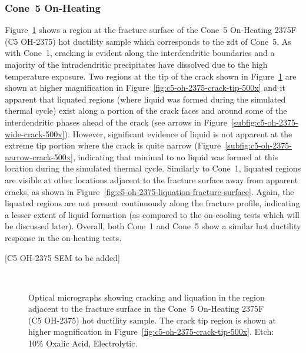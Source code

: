 \subsubsection{Cone~5 On-Heating}
Figure~\ref{fig:c5-oh-2375-olm-fracture} shows a region at the fracture surface of the Cone~5 On-Heating 2375\textdegree{}F (C5 OH-2375) hot ductility sample which corresponds to the \gls{zdt} of Cone~5. As with Cone~1, cracking is evident along the interdendritic boundaries and a majority of the intradendritic precipitates have dissolved due to the high temperature exposure. Two regions at the tip of the crack shown in Figure~\ref{fig:c5-oh-2375-olm-fracture} are shown at higher magnification in Figure~\ref{fig:c5-oh-2375-crack-tip-500x} and it apparent that liquated regions (where liquid was formed during the simulated thermal cycle) exist along a portion of the crack faces and around some of the interdendritic phases ahead of the crack (see arrows in Figure~\ref{subfig:c5-oh-2375-wide-crack-500x}). However, significant evidence of liquid is not apparent at the extreme tip portion where the crack is quite narrow (Figure~\ref{subfig:c5-oh-2375-narrow-crack-500x}, indicating that minimal to no liquid was formed at this location during the simulated thermal cycle. Similarly to Cone~1, liquated regions are visible at other locations adjacent to the fracture surface away from apparent cracks, as shown in Figure~\ref{fig:c5-oh-2375-liquation-fracture-surface}. Again, the liquated regions are not present continuously along the fracture profile, indicating a lesser extent of liquid formation (as compared to the on-cooling tests which will be discussed later). Overall, both Cone~1 and Cone~5 show a similar hot ductility response in the on-heating tests.

[C5 OH-2375 SEM to be added]

\begin{figure}
\centering
{} \\
\caption{Optical micrographs showing cracking and liquation in the region adjacent to the fracture surface in the Cone~5 On-Heating 2375\textdegree{}F (C5 OH-2375) hot ductility sample. The crack tip region is shown at higher magnification in Figure~\ref{fig:c5-oh-2375-crack-tip-500x}. Etch: 10\% Oxalic Acid, Electrolytic.}
\label{fig:c5-oh-2375-olm-fracture}
\end{figure}

